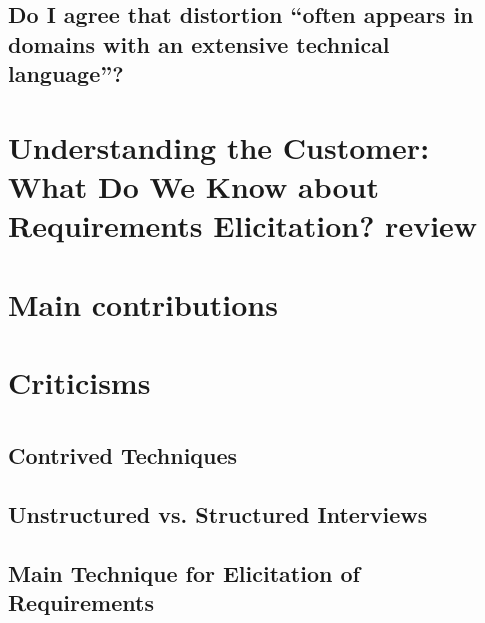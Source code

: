 \documentclass[letterpaper,12pt]{article}
\begin{document}
\subsection{Do I agree that distortion “often appears in domains with an extensive technical language”?}


\section{Understanding the Customer: What Do We Know
  about Requirements Elicitation? review}

\section{Main contributions} %


\section{Criticisms} %

\section{}

\subsection{Contrived Techniques}

\subsection{Unstructured vs. Structured Interviews}


\subsection{Main Technique for Elicitation of Requirements}
\end{document}
